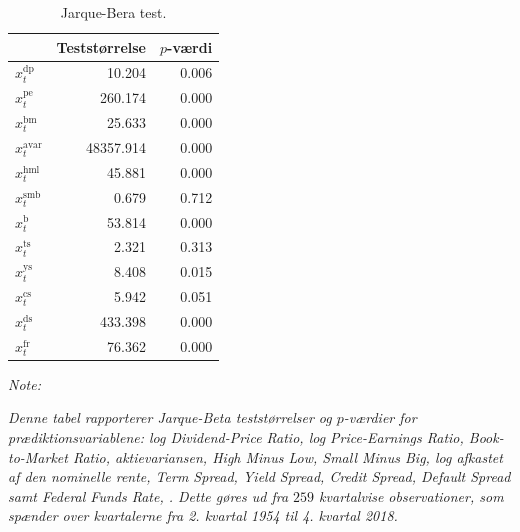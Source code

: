 \documentclass[
  a4paper,
  oneside]{memoir}
\begin{document}
\begin{landscape}
\begin{table}[!h]
\begin{threeparttable}
\begin{tablenotes}
\end{tablenotes}
\end{threeparttable}
\end{table}

\begin{table}[!h]

\caption{\label{tab:JB-TILSTANDSVARIABLE}Jarque-Bera test.}
\centering
\begin{threeparttable}
\begin{tabular}[t]{lrr}
\toprule
  & Teststørrelse & $p$-værdi\\
\midrule
\rowcolor{gray!6}  $x_t^{\text{dp}}$ & 10.204 & 0.006\\
$x_t^{\text{pe}}$ & 260.174 & 0.000\\
\rowcolor{gray!6}  $x_t^{\text{bm}}$ & 25.633 & 0.000\\
$x_t^{\text{avar}}$ & 48357.914 & 0.000\\
\rowcolor{gray!6}  $x_t^{\text{hml}}$ & 45.881 & 0.000\\
$x_t^{\text{smb}}$ & 0.679 & 0.712\\
\rowcolor{gray!6}  $x_t^{\text{b}}$ & 53.814 & 0.000\\
$x_t^{\text{ts}}$ & 2.321 & 0.313\\
\rowcolor{gray!6}  $x_t^{\text{ys}}$ & 8.408 & 0.015\\
$x_t^{\text{cs}}$ & 5.942 & 0.051\\
\rowcolor{gray!6}  $x_t^{\text{ds}}$ & 433.398 & 0.000\\
$x_t^{\text{fr}}$ & 76.362 & 0.000\\
\bottomrule
\end{tabular}
\begin{tablenotes}
\item \textit{Note: } 
\item \textit{Denne tabel rapporterer Jarque-Beta teststørrelser og $p$-værdier for prædiktionsvariablene: log Dividend-Price Ratio, log Price-Earnings Ratio, Book-to-Market Ratio, aktievariansen, High Minus Low, Small Minus Big, log afkastet af den nominelle rente, Term Spread, Yield Spread, Credit Spread, Default Spread samt Federal Funds Rate, \citep{Jarque1980}. Dette gøres ud fra $259$ kvartalvise observationer, som spænder over kvartalerne fra 2. kvartal 1954 til 4. kvartal 2018.}
\end{tablenotes}
\end{threeparttable}
\end{table}
\end{landscape}
\end{document}
